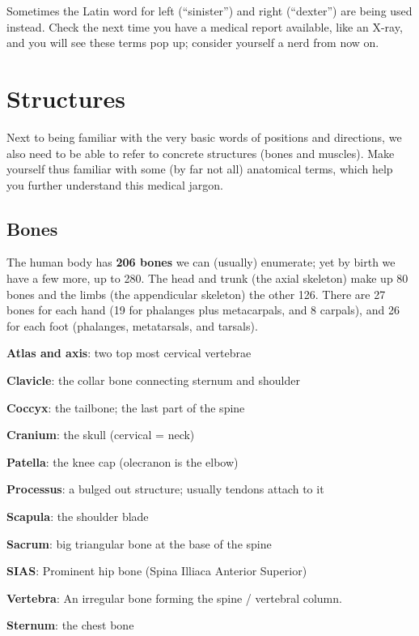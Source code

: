 Sometimes the Latin word for left (``sinister'') and right (``dexter'') are being used instead.
Check the next time you have a medical report available, like an X-ray, and you will see these terms pop up; consider yourself a nerd from now on.

\section{Structures}\label{sec:structures}

Next to being familiar with the very basic words of positions and directions, we also need to be able to refer to concrete structures (bones and muscles).
Make yourself thus familiar with some (by far not all) anatomical terms, which help you further understand this medical jargon.

\subsection{Bones}\label{subsec:bones}

The human body has \textbf{206 bones} we can (usually) enumerate; yet by birth we have a few more, up to 280.
The head and trunk (the axial skeleton) make up 80 bones and the limbs (the appendicular skeleton) the other 126.
There are 27 bones for each hand (19 for phalanges plus metacarpals, and 8 carpals), and 26 for each foot (phalanges, metatarsals, and tarsals).

\begin{itemize*}
    \item \textbf{Atlas and axis}: two top most cervical vertebrae
    \item \textbf{Clavicle}: the collar bone connecting sternum and shoulder
    \item \textbf{Coccyx}: the tailbone; the last part of the spine
    \item \textbf{Cranium}: the skull (cervical = neck)
    \item \textbf{Patella}: the knee cap (olecranon is the elbow)
    \item \textbf{Processus}: a bulged out structure; usually tendons attach to it
    \item \textbf{Scapula}: the shoulder blade
    \item \textbf{Sacrum}: big triangular bone at the base of the spine
    \item \textbf{SIAS}: Prominent hip bone (Spina Illiaca Anterior Superior)
    \item \textbf{Vertebra}: An irregular bone forming the spine / vertebral column.
    \item \textbf{Sternum}: the chest bone
\end{itemize*}

